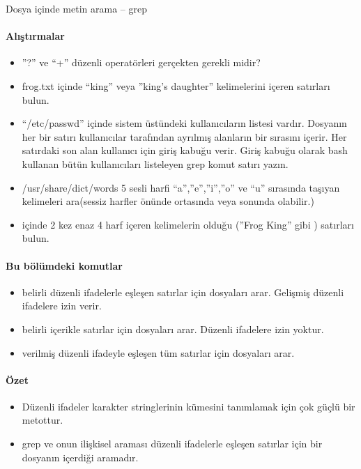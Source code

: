 \begin{section}{Dosya içinde metin arama – grep}
\paragraph{Alıştırmalar}{
\begin{itemize}
 \item ”?” ve “+”  düzenli operatörleri gerçekten gerekli midir?
\item frog.txt içinde “king” veya ”king’s daughter” kelimelerini içeren satırları bulun.
\item “/etc/passwd” içinde sistem üstündeki kullanıcıların listesi vardır. Dosyanın her bir satırı kullanıcılar tarafından ayrılmış alanların bir sırasını içerir. Her satırdaki son alan kullanıcı için giriş kabuğu verir. Giriş kabuğu olarak bash kullanan bütün kullanıcıları listeleyen grep komut satırı yazın.
\item /usr/share/dict/words  5 sesli harfi “a”,”e”,”i”,”o” ve “u” sırasında taşıyan kelimeleri ara(sessiz harfler önünde ortasında veya sonunda olabilir.)
\item içinde 2 kez  enaz 4 harf içeren kelimelerin olduğu (”Frog King” gibi ) satırları bulun.
\end{itemize}}

\paragraph{Bu bölümdeki komutlar}{
\begin{itemize}
\item[egrep]belirli düzenli ifadelerle eşleşen satırlar için dosyaları arar. Gelişmiş düzenli ifadelere izin verir.
\item[fgrep]belirli içerikle satırlar için dosyaları arar. Düzenli ifadelere izin yoktur.
\item[grep]verilmiş düzenli ifadeyle eşleşen tüm satırlar için dosyaları arar.
\end{itemize}}

\paragraph{Özet}{
\begin{itemize}
 \item Düzenli ifadeler karakter stringlerinin kümesini tanımlamak için çok güçlü bir metottur.
 \item grep ve onun ilişkisel araması düzenli ifadelerle eşleşen satırlar için bir dosyanın içerdiği aramadır.
\end{itemize}}

\end{section}